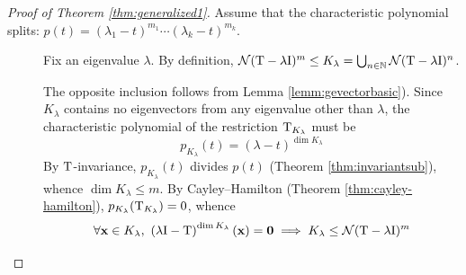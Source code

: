 \pagebreak[3]


\begin{proof}[Proof of Theorem \ref{thm:generalized1}]
	Assume that the characteristic polynomial splits: $p(t)=(\lambda_1-t)^{m_1}\cdots (\lambda_k-t)^{m_k}$.
	\begin{description}
		\item[] Fix an eigenvalue $\lambda$. By definition, $\mathcal{N}(\mathrm{T}-\lambda \mathrm{I})^m\le K_\lambda =\bigcup_{n\in\mathbb{N}}\mathcal{N}(\mathrm{T}-\lambda \mathrm{I})^n$.\par
		The opposite inclusion follows from Lemma \ref{lemm:gevectorbasic}). Since $K_\lambda$ contains no eigenvectors from any eigenvalue other than $\lambda$, the characteristic polynomial of the restriction $\mathrm{T}_{K_\lambda}$ must be
		\[
			p_{K_\lambda}(t)=(\lambda-t)^{\dim K_\lambda}
		\]
		By $\mathrm{T}$-invariance, $p_{K_\lambda}(t)$ divides $p(t)$ (Theorem \ref{thm:invariantsub}), whence $\dim K_{\lambda}\le m$.	By Cayley--Hamilton (Theorem \ref{thm:cayley-hamilton}), $p_{K_\lambda}(\mathrm{T}_{K_\lambda})=0$, whence
		\[
			\forall {\mathbf{x}}\in K_\lambda,\  \left(\lambda \mathrm{I}-\mathrm{T}\right)^{\dim K_\lambda}({\mathbf{x}})=\mathbf{0} \implies K_\lambda\le \mathcal{N}(\mathrm{T}-\lambda \mathrm{I})^m
		\]
		

\end{description}
\end{proof}
